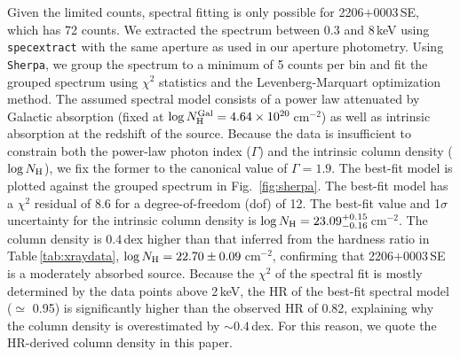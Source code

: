 \documentclass[iop,revtex4,twocolumn,apj,numberedappendix,appendixfloats]{emulateapj}
\begin{document}
Given the limited counts, spectral fitting is only possible for 2206$+$0003\,SE, which has 72 counts. We extracted the spectrum between 0.3 and 8\,keV using \texttt{specextract} with the same aperture as used in our aperture photometry. Using \texttt{Sherpa}, we group the spectrum to a minimum of 5 counts per bin and fit the grouped spectrum using $\chi^{2}$ statistics and the Levenberg-Marquart optimization method. The assumed spectral model consists of a power law attenuated by Galactic absorption (fixed at $\log N_{\rm H}^{\rm Gal} = 4.64\times10^{20}$\,cm$^{-2}$) as well as intrinsic absorption at the redshift of the source. Because the data is insufficient to constrain both the power-law photon index ($\Gamma$) and the intrinsic column density ($\log N_{\rm H}$), we fix the former to the canonical value of $\Gamma = 1.9$. The best-fit model is plotted against the grouped spectrum in Fig.~\ref{fig:sherpa}. The best-fit model has a $\chi^2$ residual of 8.6 for a degree-of-freedom (dof) of 12. The best-fit value and 1$\sigma$ uncertainty for the intrinsic column density is $\log N_{\rm H} = 23.09^{+0.15}_{-0.16}$\,cm$^{-2}$. The column density is 0.4\,dex higher than that inferred from the hardness ratio in Table\,\ref{tab:xraydata}, $\log N_{\rm H} = 22.70\pm0.09$\,cm$^{-2}$, confirming that 2206$+$0003\,SE is a moderately absorbed source. Because the $\chi^2$ of the spectral fit is mostly determined by the data points above 2\,keV, the HR of the best-fit spectral model ($\simeq$ 0.95) is significantly higher than the observed HR of 0.82, explaining why the column density is overestimated by $\sim0.4$\,dex. For this reason, we quote the HR-derived column density in this paper. 
\end{document}
